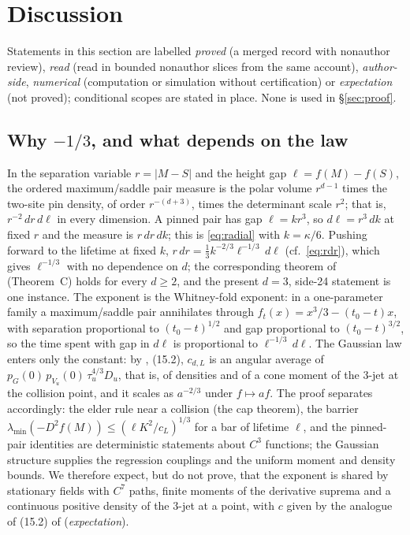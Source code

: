 \section{Discussion}\label{sec:discussion}

Statements in this section are labelled \emph{proved} (a merged record with nonauthor review), \emph{read} (read in bounded nonauthor slices from the same account), \emph{author-side}, \emph{numerical} (computation or simulation without certification) or \emph{expectation} (not proved); conditional scopes are stated in place. None is used in \S\ref{sec:proof}.

\subsection{Why \texorpdfstring{$-1/3$}{-1/3}, and what depends on the law}\label{ssec:why}
In the separation variable $r=|M-S|$ and the height gap $\ell=f(M)-f(S)$, the ordered maximum/saddle pair measure is the polar volume $r^{d-1}$ times the two-site pin density, of order $r^{-(d+3)}$, times the determinant scale $r^2$; that is, $r^{-2}\,dr\,d\ell$ in every dimension. A pinned pair has gap $\ell=kr^3$, so $d\ell=r^3\,dk$ at fixed $r$ and the measure is $r\,dr\,dk$; this is \eqref{eq:radial} with $k=\kappa/6$. Pushing forward to the lifetime at fixed $k$, $r\,dr=\tfrac13k^{-2/3}\ell^{-1/3}\,d\ell$ (cf.\ \eqref{eq:rdr}), which gives $\ell^{-1/3}$ with no dependence on $d$; the corresponding theorem of  (Theorem~C) holds for every $d\ge2$, and the present $d=3$, side-24 statement is one instance. The exponent is the Whitney-fold exponent: in a one-parameter family a maximum/saddle pair annihilates through $f_t(x)=x^3/3-(t_0-t)x$, with separation proportional to $(t_0-t)^{1/2}$ and gap proportional to $(t_0-t)^{3/2}$, so the time spent with gap in $d\ell$ is proportional to $\ell^{-1/3}\,d\ell$. The Gaussian law enters only the constant: by , (15.2), $c_{d,L}$ is an angular average of $p_G(0)\,p_{V_u}(0)\,\tau_u^{4/3}D_u$, that is, of densities and of a cone moment of the $3$-jet at the collision point, and it scales as $a^{-2/3}$ under $f\mapsto af$. The proof separates accordingly: the elder rule near a collision (the cap theorem), the barrier $\lambda_{\min}(-D^2f(M))\le(\ell K^2/c_L)^{1/3}$ for a bar of lifetime $\ell$, and the pinned-pair identities are deterministic statements about $C^3$ functions; the Gaussian structure supplies the regression couplings and the uniform moment and density bounds. We therefore expect, but do not prove, that the exponent is shared by stationary fields with $C^7$ paths, finite moments of the derivative suprema and a continuous positive density of the $3$-jet at a point, with $c$ given by the analogue of (15.2) of  (\emph{expectation}).

